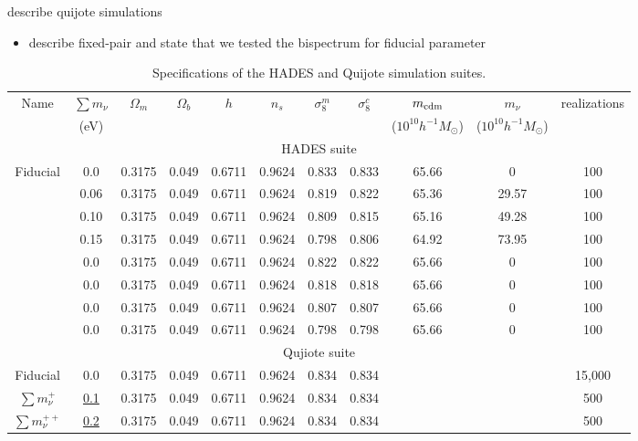 \documentclass[12pt, letterpaper, preprint]{aastex62}
\newcommand{\smnu}{\sum m_\nu}
\newcommand{\bitem}{\begin{itemize}}
\newcommand{\eitem}{\end{itemize}}
\newcommand{\ch}[1]{{\color{orange}{\bf CH:} #1}}
\begin{document}
\ch{describe quijote simulations} 
\bitem 
\item describe fixed-pair and state that we tested the bispectrum for fiducial parameter
\eitem

\begin{table}
\caption{Specifications of the HADES and Quijote simulation suites.} 
\begin{center}
\begin{tabular}{ccccccccccc} \toprule
    Name  &$\smnu$ & $\Omega_m$ & $\Omega_b$ & $h$ & $n_s$ & $\sigma^m_8$ & $\sigma^c_8$ & $m_{\rm cdm}$ & $m_\nu$ & realizations \\
      &(eV) & & & & & & & ($10^{10}h^{-1}M_\odot$) & ($10^{10}h^{-1}M_\odot$) & \\[3pt] \hline\hline
    \multicolumn{11}{c}{HADES suite} \\ \hline
    Fiducial    & 0.0   & 0.3175 & 0.049 & 0.6711 & 0.9624 & 0.833 & 0.833 & 65.66 & 0      &100 \\ 
                & 0.06  & 0.3175 & 0.049 & 0.6711 & 0.9624 & 0.819 & 0.822 & 65.36 & 29.57  &100 \\ 
                & 0.10  & 0.3175 & 0.049 & 0.6711 & 0.9624 & 0.809 & 0.815 & 65.16 & 49.28  &100 \\ 
                & 0.15  & 0.3175 & 0.049 & 0.6711 & 0.9624 & 0.798 & 0.806 & 64.92 & 73.95  &100 \\ 
                & 0.0   & 0.3175 & 0.049 & 0.6711 & 0.9624 & 0.822 & 0.822 & 65.66 & 0      &100 \\ 
                & 0.0   & 0.3175 & 0.049 & 0.6711 & 0.9624 & 0.818 & 0.818 & 65.66 & 0      &100 \\ 
                & 0.0   & 0.3175 & 0.049 & 0.6711 & 0.9624 & 0.807 & 0.807 & 65.66 & 0      &100 \\ 
                & 0.0   & 0.3175 & 0.049 & 0.6711 & 0.9624 & 0.798 & 0.798 & 65.66 & 0      &100 \\[3pt]
    \hline \hline
    \multicolumn{11}{c}{Qujiote suite} \\ \hline
    Fiducial 	    & 0.0         & 0.3175 & 0.049 & 0.6711 & 0.9624 & 0.834 & 0.834 & & & 15,000 \\ 
    $\smnu^+$       & \underline{0.1}   & 0.3175 & 0.049 & 0.6711 & 0.9624 & 0.834 & 0.834 & & & 500 \\ 
    $\smnu^{++}$    & \underline{0.2}   & 0.3175 & 0.049 & 0.6711 & 0.9624 & 0.834 & 0.834 & & & 500 \\ 

\end{tabular}
\end{center}
\end{table}
\end{document}
